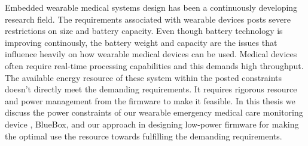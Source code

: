 \newcommand{\mypubentry}[3]{
  \begin{tabular*}{1\textwidth}{@{\extracolsep{\fill}}p{4.5in}r}
    \textbf{#1} & \textbf{#2} \\ 
    \multicolumn{2}{@{\extracolsep{\fill}}p{.95\textwidth}}{#3}\vspace{6pt} \\
  \end{tabular*}
}
\newcommand{\mysoftentry}[3]{
  \begin{tabular*}{1\textwidth}{@{\extracolsep{\fill}}lr}
    \textbf{#1} & \url{#2} \\
    \multicolumn{2}{@{\extracolsep{\fill}}p{.95\textwidth}}
    {\emph{#3}}\vspace{-6pt} \\
  \end{tabular*}
}

\thesisabstract
{
  Embedded wearable medical systems design has been a continuously developing research field. The requirements associated with wearable devices posts severe restrictions on size and battery capacity. Even though battery technology is improving continously, the battery weight and capacity are the issues that influence heavily on how wearable medical devices can be used. Medical devices often require real-time processing capabilities and this demands high throughput. The available energy resource of these system within the posted constraints doesn't directly meet the demanding requirements. It requires rigorous resource and power management from the firmware to make it feasible. In this thesis we discuss the power constraints of our wearable emergency medical care monitoring device , BlueBox, and our approach in designing low-power firmware for making the optimal use the resource towards fulfilling the demanding  requirements.
}


